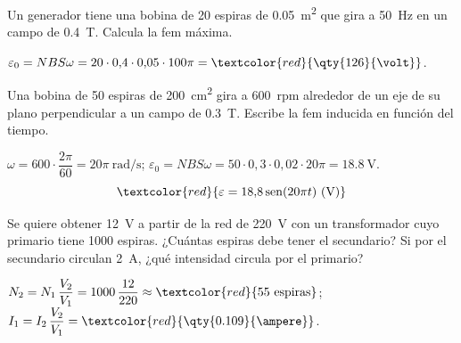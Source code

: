 \begin{exercise}
    Un generador tiene una bobina de 20 espiras de \qty{0.05}{\m\squared} que gira a \qty{50}{\hertz} en un campo de \qty{0.4}{\tesla}. Calcula la
    fem máxima.
    \begin{solu}
        \(\varepsilon_0 = NBS\omega = 20\cdot 0{,}4\cdot 0{,}05\cdot 100\pi = \textcolor{red}{\qty{126}{\volt}}\).
    \end{solu}
\end{exercise}

\begin{exercise}
    Una bobina de 50 espiras de \qty{200}{\cm\squared} gira a \qty{600}{rpm} alrededor de un eje de su plano perpendicular a un campo de
    \qty{0.3}{\tesla}. Escribe la fem inducida en función del tiempo.
    \begin{solu}
        \(\omega = 600\cdot\dfrac{2\pi}{60} = 20\pi\ \unit{\radian\per\second}\); \(\varepsilon_0 = NBS\omega = 50\cdot 0{,}3\cdot 0{,}02\cdot 20\pi = \qty{18.8}{\volt}\).
        \[ \textcolor{red}{\varepsilon = 18{,}8\sen(20\pi t)\ \text{(V)}} \]
    \end{solu}
\end{exercise}

\begin{exercise}
    Se quiere obtener \qty{12}{\volt} a partir de la red de \qty{220}{\volt} con un transformador cuyo primario tiene 1000 espiras. ¿Cuántas
    espiras debe tener el secundario? Si por el secundario circulan \qty{2}{\ampere}, ¿qué intensidad circula por el primario?
    \begin{solu}
        \(N_2 = N_1\,\dfrac{V_2}{V_1} = 1000\,\dfrac{12}{220} \approx \textcolor{red}{55\ \text{espiras}}\);
        \(I_1 = I_2\,\dfrac{V_2}{V_1} = \textcolor{red}{\qty{0.109}{\ampere}}\).
    \end{solu}
\end{exercise}
